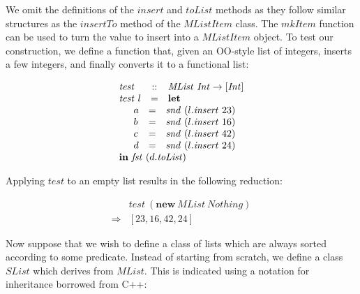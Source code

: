 \documentclass[runningheads,a4paper]{llncs}
\begin{document}
We omit the definitions of the $\mathit{insert}$ and $\mathit{toList}$ methods as they follow similar structures as the $\mathit{insertTo}$ method of the $\mathit{MListItem}$ class. The $\mathit{mkItem}$ function can be used to turn the value to insert into a $\mathit{MListItem}$ object. To test our construction, we define a function that, given an OO-style list of integers, inserts a few integers, and finally converts it to a functional list:

\begin{displaymath}
\begin{array}{lcl}
\mathit{test} & :: & \mathit{MList}~\mathit{Int} \to [\mathit{Int}]\\
\mathit{test}~l & = & \mathbf{let} \\
\multicolumn{3}{l}{\quad \begin{array}{lcl}
a & = & \mathit{snd}~(l.\mathit{insert}~23)\\
b & = & \mathit{snd}~(l.\mathit{insert}~16)\\
c & = & \mathit{snd}~(l.\mathit{insert}~42)\\
d & = & \mathit{snd}~(l.\mathit{insert}~24)\\
\end{array}}\\
\multicolumn{3}{l}{\mathbf{in}~\mathit{fst}~(d.\mathit{toList})}
\end{array}
\end{displaymath}

Applying $\mathit{test}$ to an empty list results in the following reduction:

\begin{displaymath}
\begin{array}{cl}
 & \mathit{test}~(\mathbf{new}~\mathit{MList}~\mathit{Nothing}) \\
\Rightarrow & [23,16,42,24]
\end{array}
\end{displaymath}

Now suppose that we wish to define a class of lists which are always sorted according to some predicate. Instead of starting from scratch, we define a class $\mathit{SList}$ which derives from $\mathit{MList}$. This is indicated using a notation for inheritance borrowed from C++:
\end{document}
